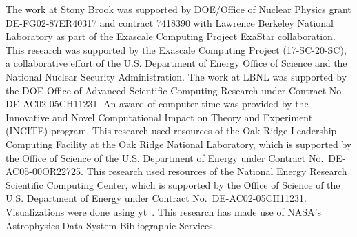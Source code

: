 \documentclass[a4paper]{jpconf}
\begin{document}
\ack The work at Stony Brook was supported by DOE/Office of Nuclear
Physics grant DE-FG02-87ER40317 and contract 7418390 with Lawrence
Berkeley National Laboratory as part of the Exascale Computing Project
ExaStar collaboration.  This research was supported by the Exascale
Computing Project (17-SC-20-SC), a collaborative effort of the
U.S. Department of Energy Office of Science and the National Nuclear
Security Administration.  The work at LBNL was supported by the DOE
Office of Advanced Scientific Computing Research under Contract No,
DE-AC02-05CH11231.  An award of computer time was provided by the
Innovative and Novel Computational Impact on Theory and Experiment
(INCITE) program. This research used resources of the Oak Ridge
Leadership Computing Facility at the Oak Ridge National Laboratory,
which is supported by the Office of Science of the U.S. Department of
Energy under Contract No.\ DE-AC05-00OR22725.  This research used
resources of the National Energy Research Scientific Computing Center,
which is supported by the Office of Science of the U.S. Department of
Energy under Contract No.\ DE-AC02-05CH11231.  Visualizations were
done using yt~\cite{yt}.  This research has made use of NASA's
Astrophysics Data System Bibliographic Services.





\end{document}
